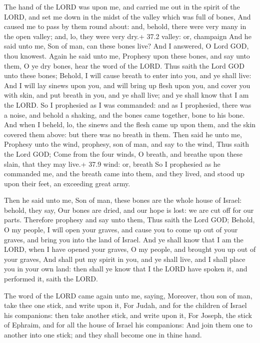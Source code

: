  The hand of the LORD was upon me, and carried me out in the
spirit of the LORD, and set me down in the midst of the valley which was
full of bones,  And caused me to pass by them round about:
and, behold, there were very many in the open valley; and, lo, they were
very dry.+ 37.2 valley: or, champaign  And he said unto me,
Son of man, can these bones live? And I answered, O Lord GOD, thou
knowest.  Again he said unto me, Prophesy upon these bones,
and say unto them, O ye dry bones, hear the word of the LORD.
 Thus saith the Lord GOD unto these bones; Behold, I will
cause breath to enter into you, and ye shall live:  And I
will lay sinews upon you, and will bring up flesh upon you, and cover
you with skin, and put breath in you, and ye shall live; and ye shall
know that I am the LORD.  So I prophesied as I was
commanded: and as I prophesied, there was a noise, and behold a shaking,
and the bones came together, bone to his bone.  And when I
beheld, lo, the sinews and the flesh came up upon them, and the skin
covered them above: but there was no breath in them.  Then
said he unto me, Prophesy unto the wind, prophesy, son of man, and say
to the wind, Thus saith the Lord GOD; Come from the four winds, O
breath, and breathe upon these slain, that they may live.+ 37.9 wind:
or, breath  So I prophesied as he commanded me, and the
breath came into them, and they lived, and stood up upon their feet, an
exceeding great army.

 Then he said unto me, Son of man, these bones are the
whole house of Israel: behold, they say, Our bones are dried, and our
hope is lost: we are cut off for our parts.  Therefore
prophesy and say unto them, Thus saith the Lord GOD; Behold, O my
people, I will open your graves, and cause you to come up out of your
graves, and bring you into the land of Israel.  And ye
shall know that I am the LORD, when I have opened your graves, O my
people, and brought you up out of your graves,  And shall
put my spirit in you, and ye shall live, and I shall place you in your
own land: then shall ye know that I the LORD have spoken it, and
performed it, saith the LORD.

 The word of the LORD came again unto me, saying,
 Moreover, thou son of man, take thee one stick, and write
upon it, For Judah, and for the children of Israel his companions: then
take another stick, and write upon it, For Joseph, the stick of Ephraim,
and for all the house of Israel his companions:  And join
them one to another into one stick; and they shall become one in thine
hand.

